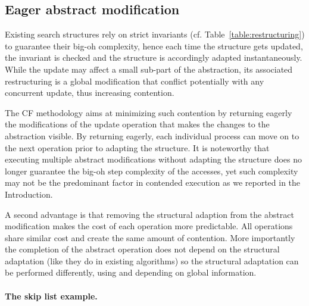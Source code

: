 \vspace{-1em}
\subsection{Eager abstract modification}

Existing search structures rely on strict invariants (cf. Table~\ref{table:restructuring}) to guarantee their big-oh complexity, hence each 
time the structure gets updated,  the invariant is checked and the structure is accordingly 
adapted instantaneously. While the update may affect a small sub-part of the abstraction, 
its associated restructuring is a global modification that conflict potentially with any concurrent update, 
thus increasing contention.
 
The CF methodology aims at minimizing such contention by returning eagerly the modifications of the 
update operation that makes the changes to the abstraction visible. By returning eagerly, each 
individual process can move on to the next operation prior to adapting the structure. It is noteworthy 
that executing multiple abstract modifications without adapting the structure does no longer guarantee the big-oh step complexity of the accesses, yet such complexity may not be the predominant factor in 
contended execution as we reported in the Introduction.

A second advantage is that removing the structural adaption from the abstract modification makes the cost of each operation more predictable.  All operations share similar cost and create the same amount of contention.
More importantly the completion of the abstract operation does not depend on the structural adaptation
(like they do in existing algorithms) 
so the structural adaptation can be performed differently, using and depending on global information.

\vspace{-1em}
\paragraph{The skip list example.}

